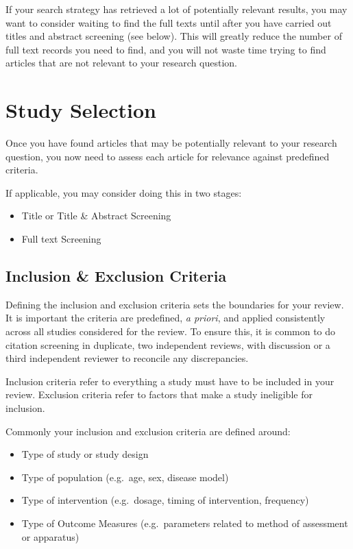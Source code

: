 \documentclass[
]{book}
\providecommand{\tightlist}{%
  \setlength{\itemsep}{0pt}\setlength{\parskip}{0pt}}
\begin{document}
If your search strategy has retrieved a lot of potentially relevant results, you may want to consider waiting to find the full texts until after you have carried out titles and abstract screening (see below). This will greatly reduce the number of full text records you need to find, and you will not waste time trying to find articles that are not relevant to your research question.

\hypertarget{study-selection}{%
\chapter{Study Selection}\label{study-selection}}

Once you have found articles that may be potentially relevant to your research question, you now need to assess each article for relevance against predefined criteria.

If applicable, you may consider doing this in two stages:

\begin{itemize}
\tightlist
\item
  Title or Title \& Abstract Screening
\item
  Full text Screening
\end{itemize}

\hypertarget{inclusion-exclusion-criteria}{%
\section{Inclusion \& Exclusion Criteria}\label{inclusion-exclusion-criteria}}

Defining the inclusion and exclusion criteria sets the boundaries for your review.
It is important the criteria are predefined, \emph{a priori}, and applied consistently across all studies considered for the review. To ensure this, it is common to do citation screening in duplicate, two independent reviews, with discussion or a third independent reviewer to reconcile any discrepancies.

Inclusion criteria refer to everything a study must have to be included in your review.
Exclusion criteria refer to factors that make a study ineligible for inclusion.

Commonly your inclusion and exclusion criteria are defined around:

\begin{itemize}
\item
  Type of study or study design
\item
  Type of population (e.g.~age, sex, disease model)
\item
  Type of intervention (e.g.~dosage, timing of intervention, frequency)
\item
  Type of Outcome Measures (e.g.~parameters related to method of assessment or apparatus)
\end{itemize}
\end{document}
